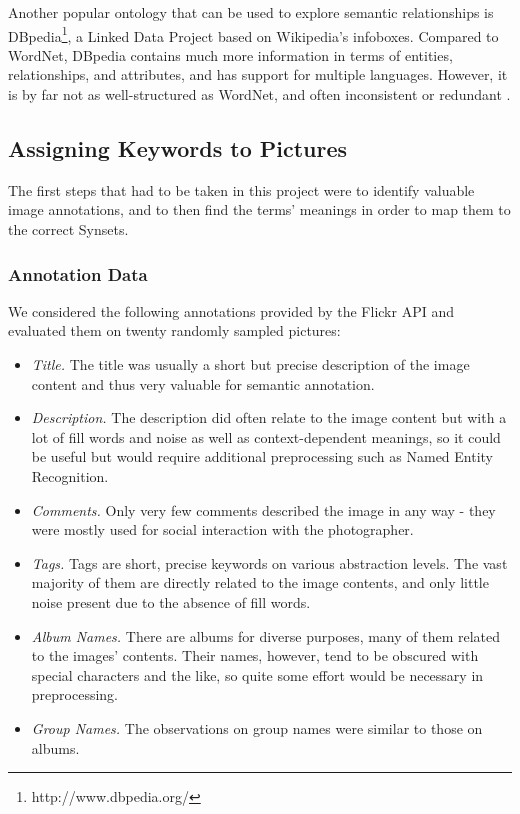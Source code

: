 Another popular ontology that can be used to explore semantic relationships is DBpedia\footnote{http://www.dbpedia.org/}, a Linked Data Project based on Wikipedia's infoboxes.
Compared to WordNet, DBpedia contains much more information in terms of entities, relationships, and attributes, and has support for multiple languages. However, it is by far not as well-structured as WordNet, and often inconsistent or redundant \cite{suchanek2008yago}.

\subsection{Assigning Keywords to Pictures}
\label{sec_keywordstopictures}
The first steps that had to be taken in this project were to identify valuable image annotations, and to then find the terms' meanings in order to map them to the correct Synsets.

\subsubsection{Annotation Data}
\label{sec_annotationdata}
We considered the following annotations provided by the Flickr API and evaluated them on twenty randomly sampled pictures:
\begin{itemize}
\item{\emph{Title.}} The title was usually a short but precise description of the image content and thus very valuable for semantic annotation.
\item{\emph{Description.}} The description did often relate to the image content but with a lot of fill words and noise as well as context-dependent meanings, so it could be useful but would require additional preprocessing such as Named Entity Recognition.
\item{\emph{Comments.}} Only very few comments described the image in any way - they were mostly used for social interaction with the photographer.
\item{\emph{Tags.}} Tags are short, precise keywords on various abstraction levels. The vast majority of them are directly related to the image contents, and only little noise present due to the absence of fill words.
\item{\emph{Album Names.}} There are albums for diverse purposes, many of them related to the images' contents. Their names, however, tend to be obscured with special characters and the like, so quite some effort would be necessary in preprocessing.
\item{\emph{Group Names.}} The observations on group names were similar to those on albums.
\end{itemize}

